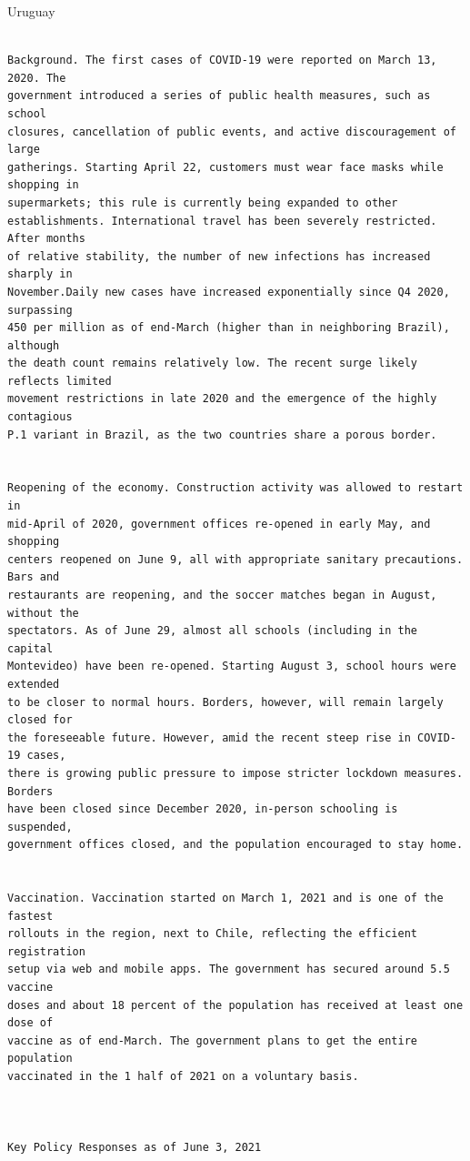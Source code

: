 \documentclass[10pt, letterpaper]{article}
\begin{document}
\begin{spacing}{1.4}
Uruguay
\begin{scriptsize}
\begin{spacing}{.85}
\begin{verbatim}

Background. The first cases of COVID-19 were reported on March 13, 2020. The
government introduced a series of public health measures, such as school
closures, cancellation of public events, and active discouragement of large
gatherings. Starting April 22, customers must wear face masks while shopping in
supermarkets; this rule is currently being expanded to other
establishments. International travel has been severely restricted. After months
of relative stability, the number of new infections has increased sharply in
November.Daily new cases have increased exponentially since Q4 2020, surpassing
450 per million as of end-March (higher than in neighboring Brazil), although
the death count remains relatively low. The recent surge likely reflects limited
movement restrictions in late 2020 and the emergence of the highly contagious
P.1 variant in Brazil, as the two countries share a porous border.


Reopening of the economy. Construction activity was allowed to restart in
mid-April of 2020, government offices re-opened in early May, and shopping
centers reopened on June 9, all with appropriate sanitary precautions. Bars and
restaurants are reopening, and the soccer matches began in August, without the
spectators. As of June 29, almost all schools (including in the capital
Montevideo) have been re-opened. Starting August 3, school hours were extended
to be closer to normal hours. Borders, however, will remain largely closed for
the foreseeable future. However, amid the recent steep rise in COVID-19 cases,
there is growing public pressure to impose stricter lockdown measures. Borders
have been closed since December 2020, in-person schooling is suspended,
government offices closed, and the population encouraged to stay home.


Vaccination. Vaccination started on March 1, 2021 and is one of the fastest
rollouts in the region, next to Chile, reflecting the efficient registration
setup via web and mobile apps. The government has secured around 5.5 vaccine
doses and about 18 percent of the population has received at least one dose of
vaccine as of end-March. The government plans to get the entire population
vaccinated in the 1 half of 2021 on a voluntary basis.



Key Policy Responses as of June 3, 2021


\end{verbatim}
\end{spacing}
\end{scriptsize}
\end{spacing}
\end{document}
